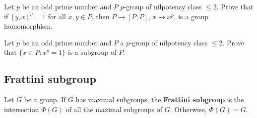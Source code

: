 
\begin{exercise}
\label{xca:class2_homomorphism}
Let $p$ be an odd prime number and 
$P$ $p$-group of nilpotency class $\leq2$. 
Prove that if $[y,x]^p=1$ for all $x,y\in P$, then
$P\to [P,P]$,
$x\mapsto x^p$, is a group homomorphism. 
\end{exercise}


\begin{exercise}
\label{xca:class2_torsion}
Let $p$ be an odd prime number and 
$P$ a $p$-group of nilpotency class $\leq2$. 
Prove that $\{x\in P:x^p=1\}$ is a subgroup of $P$.
\end{exercise}



\subsection{Frattini subgroup}

\begin{definition}
Let $G$ be a group. If $G$ has maximal subgroups, 
the \textbf{Frattini subgroup} is the intersection 
$\Phi(G)$ of all the maximal subgroups of $G$. 
Otherwise, 
$\Phi(G)=G$. 
\end{definition}

